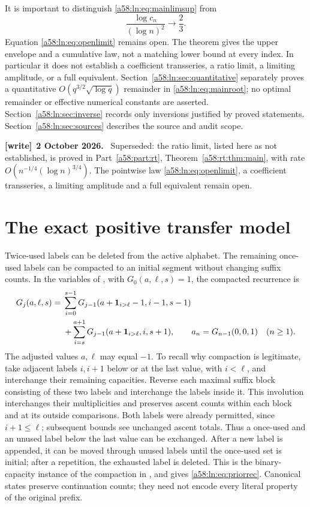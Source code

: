 \documentclass[11pt,letterpaper]{article}
\theoremstyle{remark}
\newcommand{\one}{\mathbf 1}
\newenvironment{writenote}[1][]{\par\smallskip\begingroup\small
 \noindent\textbf{[write]}\if\relax\detokenize{#1}\relax\else~\textbf{#1.}\fi\ }%
 {\par\endgroup\smallskip}
\begin{document}
It is important to distinguish \eqref{a58:ln:eq:mainlimsup} from
\begin{equation}\label{a58:ln:eq:openlimit}
 \frac{\log c_n}{(\log n)^2}\longrightarrow\frac23.
\end{equation}
Equation \eqref{a58:ln:eq:openlimit} remains open. The theorem gives the upper
envelope and a cumulative law, not a matching lower bound at every
index. In particular it does not establish a coefficient transseries,
a ratio limit, a limiting amplitude, or a full equivalent. Section~\ref{a58:ln:sec:quantitative} separately proves a quantitative
$O(q^{3/2}\sqrt{\log q})$ remainder in \eqref{a58:ln:eq:mainroot}; no optimal
remainder or effective numerical constants are asserted.
Section~\ref{a58:ln:sec:inverse} records only inversions justified by proved
statements. Section~\ref{a58:ln:sec:sources} describes the source and audit scope.
\begin{writenote}[2 October 2026]
Superseded: the ratio limit, listed here as not established, is proved in Part~\ref{a58:part:rt}, Theorem~\ref{a58:rt:thm:main}, with rate $O(n^{-1/4}(\log n)^{3/4})$. The pointwise law \eqref{a58:ln:eq:openlimit}, a coefficient transseries, a limiting amplitude and a full equivalent remain open.
\end{writenote}

\section{The exact positive transfer model}\label{a58:ln:sec:model}
Twice-used labels can be deleted from the active alphabet. The remaining
once-used labels can be compacted to an initial segment without changing
suffix counts. In the variables of \cite{CCEG}, with $G_0(a,\ell,s)=1$,
the compacted recurrence is
\begin{align}\label{a58:ln:eq:priorrec}
 G_j(a,\ell,s)={}&\sum_{i=0}^{s-1}
 G_{j-1}(a+\one_{i>\ell}-1,i-1,s-1)\notag\\
 &+\sum_{i=s}^{a+1}G_{j-1}(a+\one_{i>\ell},i,s+1),
 \qquad a_n=G_{n-1}(0,0,1)\quad(n\ge1).
\end{align}
The adjusted values $a,\ell$ may equal $-1$. To recall why compaction is
legitimate, take adjacent labels $i,i+1$ below or at the last value, with
$i<\ell$, and interchange their remaining capacities. Reverse each
maximal suffix block consisting of these two labels and interchange the
labels inside it. This involution interchanges their multiplicities and
preserves ascent counts within each block and at its outside comparisons.
Both labels were already permitted, since $i+1\le\ell$; subsequent
bounds see unchanged ascent totals. Thus a once-used and an unused
label below the last value can be exchanged. After a new label is
appended, it can be moved through unused labels until the once-used set
is initial; after a repetition, the exhausted label is deleted. This is
the binary-capacity instance of the compaction in \cite{CCEG}, and gives
\eqref{a58:ln:eq:priorrec}. Canonical states preserve continuation counts; they
need not encode every literal property of the original prefix.
\end{document}

